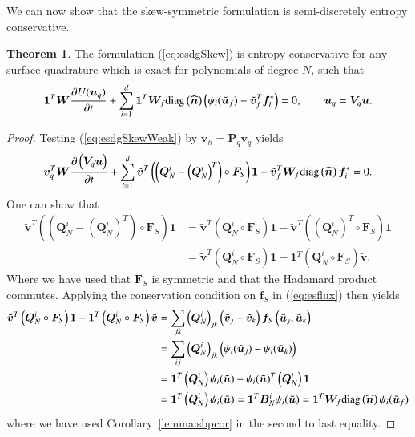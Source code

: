 \documentclass[preprint,10pt]{elsarticle}
\theoremstyle{definition}
\theoremstyle{lemma}
\theoremstyle{corollary}
\theoremstyle{theorem}
\newtheorem{theorem}{Theorem}
\theoremstyle{assumption}
\renewcommand{\hat}[1]{\widehat{#1}}
\newcommand{\pd}[2]{\frac{\partial#1}{\partial#2}}
\newcommand{\LRp}[1]{\left( #1 \right)}
\newcommand{\diag}[1]{{\rm diag}\LRp{#1}}
\begin{document}
We can now show that the skew-symmetric formulation is semi-discretely entropy conservative.  
\begin{theorem}
The formulation (\ref{eq:esdgSkew}) is entropy conservative for any surface quadrature which is exact for polynomials of degree $N$, such that
\[
\bm{1}^T\bm{W}\pd{U(\bm{u}_q)}{t} + \sum_{i=1}^d\bm{1}^T\bm{W}_f \diag{\hat{\bm{n}}} \LRp{\psi_i(\tilde{\bm{u}}_f) - \tilde{\bm{v}}_f^T\bm{f}_i^*} = 0, \qquad \bm{u}_q = \bm{V}_q\bm{u}.
\]
\label{thm:esdg}
\end{theorem}
\begin{proof}
Testing (\ref{eq:esdgSkewWeak}) by $\bm{v}_h = \bm{P}_q\bm{v}_q$ yields 
\begin{align}
\bm{v}_q^T\bm{W}\pd{\LRp{\bm{V}_q\bm{u}}}{t} + \sum_{i=1}^d
\tilde{\bm{v}}^T \LRp{\LRp{\bm{Q}^i_N - \LRp{\bm{Q}^i_N}^T} \circ \bm{F}_S}\bm{1} + \tilde{\bm{v}}_f^T \bm{W}_f \diag{\hat{\bm{n}}}\bm{f}_i^* = 0.
\end{align}
One can show that \cite{chan2017discretely}
\begin{align*}
\tilde{\bm{v}}^T \LRp{\LRp{\bm{Q}^i_N - \LRp{\bm{Q}^i_N}^T} \circ \bm{F}_S}\bm{1} &= \tilde{\bm{v}}^T \LRp{\bm{Q}^i_N \circ \bm{F}_S}\bm{1} - \tilde{\bm{v}}^T \LRp{\LRp{\bm{Q}^i_N}^T \circ \bm{F}_S}\bm{1}\\
&= \tilde{\bm{v}}^T \LRp{\bm{Q}^i_N \circ \bm{F}_S}\bm{1} - \bm{1}^T \LRp{{\bm{Q}^i_N} \circ \bm{F}_S}\tilde{\bm{v}}.
\end{align*}
Where we have used that $\bm{F}_S$ is symmetric and that the Hadamard product commutes.  Applying the conservation condition on $\bm{f}_S$ in (\ref{eq:esflux}) then yields
\begin{align*}
\tilde{\bm{v}}^T \LRp{\bm{Q}^i_N \circ \bm{F}_S}\bm{1} - \bm{1}^T \LRp{{\bm{Q}^i_N} \circ \bm{F}_S}\tilde{\bm{v}} &= \sum_{jk} \LRp{\bm{Q}^i_N}_{jk} \LRp{\tilde{\bm{v}}_j-\tilde{\bm{v}}_k} \bm{f}_S\LRp{\tilde{\bm{u}}_j,\tilde{\bm{u}}_k} \\
&= \sum_{ij} \LRp{\bm{Q}^i_N}_{jk} \LRp{\psi_i(\tilde{\bm{u}}_j) - \psi_i(\tilde{\bm{u}}_k)}\\
&= \bm{1}^T\LRp{\bm{Q}^i_N}\psi_i(\tilde{\bm{u}}) - \psi_i(\tilde{\bm{u}})^T\LRp{\bm{Q}^i_N}\bm{1} \\
&= \bm{1}^T\LRp{\bm{Q}^i_N}\psi_i(\tilde{\bm{u}}) = \bm{1}^T\bm{B}^i_N\psi_i(\tilde{\bm{u}}) = \bm{1}^T\bm{W}_f \diag{\hat{\bm{n}}} \psi_i(\tilde{\bm{u}}_f)
\end{align*}
where we have used Corollary~\ref{lemma:sbpcor} in the second to last equality.
\end{proof}
\end{document}
